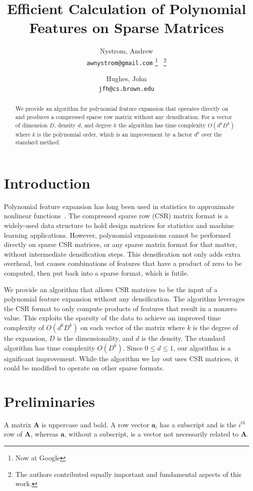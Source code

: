 \documentclass{article} %
\title{Efficient Calculation of Polynomial Features on Sparse Matrices}
\author{
  Nystrom, Andrew \\
  \texttt{awnystrom@gmail.com}
  \thanks{Now at Google}
  \ 
  \thanks{The authors contributed equally important and fundamental aspects of this work.}
  \and
  Hughes, John \\
  \texttt{jfh@cs.brown.edu}
  \footnotemark[2]
}
\begin{document}
\maketitle

\begin{abstract}
We provide an algorithm for polynomial feature expansion that operates directly on and produces a compressed sparse row matrix without any densification.
For a vector of dimension $D$, density $d$, and degree $k$ the algorithm has time complexity $O(d^kD^k)$ where $k$ is the polynomial order, which is an improvement by a factor $d^k$ over the standard method.
\end{abstract}

\section{Introduction}

Polynomial feature expansion has long been used in statistics to approximate nonlinear functions~\cite{gergonne1974application, smith1918standard}.
The compressed sparse row (CSR) matrix format is a widely-used data structure to hold design matrices for statistics and machine learning applications.
However, polynomial expansions cannot be performed directly on sparse CSR matrices, or any sparse matrix format for that matter, without intermediate densification steps.
This densification not only adds extra overhead, but causes combinations of features that have a product of zero to be computed, then put back into a sparse format, which is futile.

We provide an algorithm that allows CSR matrices to be the input of a polynomial feature expansion without any densification.
The algorithm leverages the CSR format to only compute products of features that result in a nonzero value.
This exploits the sparsity of the data to achieve an improved time complexity of $O(d^kD^k)$ on each vector of the matrix where $k$ is the degree of the expansion, $D$ is the dimensionality, and $d$ is the density.
The standard algorithm has time complexity $O(D^k)$.
Since $0 \le d \le 1$, our algorithm is a significant improvement.
While the algorithm we lay out uses CSR matrices, it could be modified to operate on other sparse formats.

\section{Preliminaries}
A matrix $\bm{A}$ is uppercase and bold.
A row vector $\bm{a}_i$ has a subscript and is the $i^{th}$ row of $\bm{A}$, whereas $\bm{a}$, without a subscript, is a vector not necessarily related to $\bm{A}$.
\end{document}
